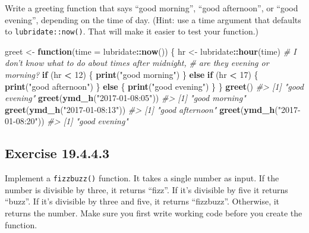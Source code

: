 \documentclass[]{book}
\newenvironment{Shaded}{\begin{snugshade}}{\end{snugshade}}
\newcommand{\CommentTok}[1]{\textcolor[rgb]{0.56,0.35,0.01}{\textit{#1}}}
\newcommand{\ControlFlowTok}[1]{\textcolor[rgb]{0.13,0.29,0.53}{\textbf{#1}}}
\newcommand{\DataTypeTok}[1]{\textcolor[rgb]{0.13,0.29,0.53}{#1}}
\newcommand{\DecValTok}[1]{\textcolor[rgb]{0.00,0.00,0.81}{#1}}
\newcommand{\KeywordTok}[1]{\textcolor[rgb]{0.13,0.29,0.53}{\textbf{#1}}}
\newcommand{\NormalTok}[1]{#1}
\newcommand{\OperatorTok}[1]{\textcolor[rgb]{0.81,0.36,0.00}{\textbf{#1}}}
\newcommand{\StringTok}[1]{\textcolor[rgb]{0.31,0.60,0.02}{#1}}
\theoremstyle{plain}
\theoremstyle{remark}
\begin{document}
Write a greeting function that says ``good morning'', ``good afternoon'', or ``good evening'', depending on the time of day. (Hint: use a time argument that defaults to \texttt{lubridate::now()}. That will make it easier to test your function.)

\begin{Shaded}
\begin{Highlighting}[]
\NormalTok{greet <-}\StringTok{ }\ControlFlowTok{function}\NormalTok{(}\DataTypeTok{time =}\NormalTok{ lubridate}\OperatorTok{::}\KeywordTok{now}\NormalTok{()) \{}
\NormalTok{  hr <-}\StringTok{ }\NormalTok{lubridate}\OperatorTok{::}\KeywordTok{hour}\NormalTok{(time)}
  \CommentTok{# I don't know what to do about times after midnight,}
  \CommentTok{# are they evening or morning?}
  \ControlFlowTok{if}\NormalTok{ (hr }\OperatorTok{<}\StringTok{ }\DecValTok{12}\NormalTok{) \{}
    \KeywordTok{print}\NormalTok{(}\StringTok{"good morning"}\NormalTok{)}
\NormalTok{  \} }\ControlFlowTok{else} \ControlFlowTok{if}\NormalTok{ (hr }\OperatorTok{<}\StringTok{ }\DecValTok{17}\NormalTok{) \{}
    \KeywordTok{print}\NormalTok{(}\StringTok{"good afternoon"}\NormalTok{)}
\NormalTok{  \} }\ControlFlowTok{else}\NormalTok{ \{}
    \KeywordTok{print}\NormalTok{(}\StringTok{"good evening"}\NormalTok{)}
\NormalTok{  \}}
\NormalTok{\}}
\KeywordTok{greet}\NormalTok{()}
\CommentTok{#> [1] "good evening"}
\KeywordTok{greet}\NormalTok{(}\KeywordTok{ymd_h}\NormalTok{(}\StringTok{"2017-01-08:05"}\NormalTok{))}
\CommentTok{#> [1] "good morning"}
\KeywordTok{greet}\NormalTok{(}\KeywordTok{ymd_h}\NormalTok{(}\StringTok{"2017-01-08:13"}\NormalTok{))}
\CommentTok{#> [1] "good afternoon"}
\KeywordTok{greet}\NormalTok{(}\KeywordTok{ymd_h}\NormalTok{(}\StringTok{"2017-01-08:20"}\NormalTok{))}
\CommentTok{#> [1] "good evening"}
\end{Highlighting}
\end{Shaded}

\hypertarget{exercise-19.4.4.3}{%
\subsection*{\texorpdfstring{Exercise {19.4.4.3}}{Exercise 19.4.4.3}}\label{exercise-19.4.4.3}}

Implement a \texttt{fizzbuzz()} function. It takes a single number as input. If the
number is divisible by three, it returns ``fizz''. If it's divisible by five it
returns ``buzz''. If it's divisible by three and five, it returns ``fizzbuzz''.
Otherwise, it returns the number. Make sure you first write working code before
you create the function.
\end{document}
